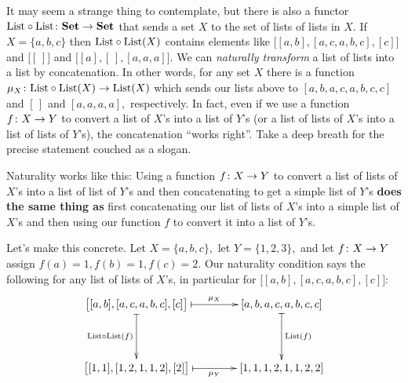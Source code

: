 \documentclass[CT4S-EN-RU]{subfiles}
\begin{document}
\begin{blockENG}
It may seem a strange thing to contemplate, but there is also a functor $\textnormal{List}\circ\textnormal{List}\colon{\mathbf{Set}}\rightarrow{\mathbf{Set}}$ that sends a set $X$ to the set of lists of lists in $X.$ If $X=\{a,b,c\}$ then $\textnormal{List}\circ\textnormal{List}(X)$ contains elements like $\big[[a,b],[a,c,a,b,c],[c]\big]$ and $\big[[\,]\big]$ and $\big[[a],[\,],[a,a,a]\big].$ We can {\em naturally transform} a list of lists into a list by concatenation. In other words, for any set $X$ there is a function $\mu_X\colon\textnormal{List}\circ\textnormal{List}(X)\rightarrow\textnormal{List}(X)$ which sends our lists above to $[a,b,a,c,a,b,c,c]$ and $[\,]$ and $[a,a,a,a],$ respectively. In fact, even if we use a function $f\colon X\rightarrow Y$ to convert a list of $X$'s into a list of $Y$'s (or a list of lists of $X$'s into a list of lists of $Y$'s), the concatenation “works right”. Take a deep breath for the precise statement couched as a slogan.
\end{blockENG}

\begin{blockRUS}
\end{blockRUS}

\begin{sloganENG}
Naturality works like this: Using a function $f\colon X\rightarrow Y$ to convert a list of lists of $X$'s into a list of list of $Y$'s and then concatenating to get a simple list of $Y$'s {\bf does the same thing as} first concatenating our list of lists of $X$'s into a simple list of $X$'s and then using our function $f$ to convert it into a list of $Y$'s.
\end{sloganENG}

\begin{sloganRUS}
\end{sloganRUS}

\begin{blockENG}
Let's make this concrete. Let $X=\{a,b,c\},$ let $Y=\{1,2,3\},$ and let $f\colon X\rightarrow Y$ assign $f(a)=1, f(b)=1, f(c)=2.$ Our naturality condition says the following for any list of lists of $X$'s, in particular for $\big[[a,b],[a,c,a,b,c],[c]\big]$:
$$\xymatrix@=40pt{
\big[[a,b],[a,c,a,b,c],[c]\big]\ar@{|->}[r]^-{\mu_X}\ar@{|->}[d]_{\List\circ\List(f)}&[a,b,a,c,a,b,c,c]\ar@{|->}[d]^{\List(f)}\\
\big[[1,1],[1,2,1,1,2],[2]\big]\ar@{|->}[r]_-{\mu_Y}&[1,1,1,2,1,1,2,2]
}
$$
\end{blockENG}

\begin{blockRUS}
\end{blockRUS}
\end{document}
